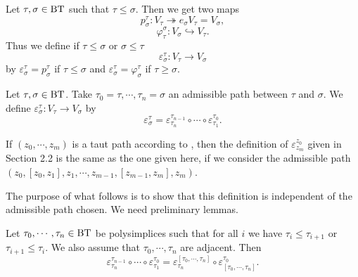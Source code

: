 \documentclass[a4paper,10pt]{amsart}
\begin{document}
Let $\tau,\sigma \in \bt$ such that $\tau \leq \sigma$. Then we get two maps
\[ p_{\sigma}^{\tau} : V_{\tau} \twoheadrightarrow e_{\sigma}V_{\tau}=V_{\sigma},\]
\[ \varphi_{\tau}^{\sigma} : V_{\sigma} \hookrightarrow V_{\tau}.\]
Thus we define if $\tau \leq \sigma$ or $\sigma \leq \tau$
\[ \varepsilon_{\sigma}^{\tau} : V_{\tau} \rightarrow V_{\sigma}\]
by $\varepsilon_{\sigma}^{\tau}=p_{\sigma}^{\tau}$ if $\tau \leq \sigma$ and $\varepsilon_{\sigma}^{\tau}=\varphi_{\sigma}^{\tau}$ if $\tau \geq \sigma$.

\begin{Def}
Let $\tau,\sigma \in \bt$. Take $\tau_{0}=\tau,\cdots,\tau_{n}=\sigma$ an admissible path between $\tau$ and $\sigma$. We define $\varepsilon_{\sigma}^{\tau} : V_{\tau} \rightarrow V_{\sigma}$ by
\[ \varepsilon_{\sigma}^{\tau} = \varepsilon^{\tau_{n-1}}_{\tau_{n}} \circ \cdots \circ \varepsilon_{\tau_{1}}^{\tau_{0}}.\]
\end{Def}


\begin{Rem}
If $(z_{0},\cdots,z_{m})$ is a taut path according to \cite{Wanga}, then the definition of $\varepsilon_{z_{m}}^{z_{0}}$ given in \cite{Wanga} Section 2.2 is the same as the one given here, if we consider the admissible path $(z_{0}, [z_{0},z_{1}], z_{1} ,\cdots,z_{m-1},[z_{m-1},z_{m}],z_{m})$.
\end{Rem}

The purpose of what follows is to show that this definition is independent of the admissible path chosen. We need preliminary lemmas.

\begin{Lem}
\label{lemadjacent}
Let $\tau_{0},\cdots,\tau_{n} \in \bt$ be polysimplices such that for all $i$ we have $\tau_{i} \leq \tau_{i+1}$ or $\tau_{i+1} \leq \tau_{i}$. We also assume that $\tau_{0},\cdots,\tau_{n}$ are adjacent. Then
\[ \varepsilon^{\tau_{n-1}}_{\tau_{n}} \circ \cdots \circ \varepsilon_{\tau_{1}}^{\tau_{0}} = \varepsilon^{[\tau_{0},\cdots,\tau_{n}]}_{\tau_{n}} \circ \varepsilon_{[\tau_{0},\cdots,\tau_{n}]}^{\tau_{0}}.\]
\end{Lem}
\end{document}
